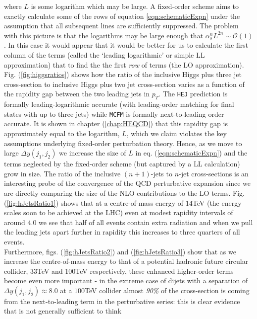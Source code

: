 		where $L$ is some logarithm which may be large.  A fixed-order scheme aims to exactly calculate some of the rows of equation
		\eqref{eqn:schematicExpn} under the assumption that all subsequent lines are sufficiently suppressed.  The problem with this
		picture is that the logarithms may be large enough that $\alpha_s^nL^{2n}\sim\mathcal{O}(1)$.  In this case it would appear
		that it would be better for us to calculate the first column of the terms (called the `leading logarithmic' or simple LL
		approximation) that to find the the first \emph{row} of terms (the LO approximation).\\Fig. (\ref{fig:higgsratios}) shows how
		the ratio of the inclusive Higgs plus three jet cross-section to inclusive Higgs plus two jet cross-section varies as
		a function of the rapidity gap between the two leading jets in $p_T$.  The \texttt{HEJ} prediction is formally leading-logarithmic
		accurate (with leading-order matching for final states with up to three jets) while \texttt{MCFM} is formally next-to-leading order
		accurate.  It is shown in chapter (\ref{chap:HEQCD}) that this rapidity gap is approximately equal to the logarithm, $L$, which
		we claim violates the key assumptions underlying fixed-order perturbation theory.  Hence, as we move to large $\Delta y(j_1, j_2)$
		we increase the size of $L$ in eq. (\ref{eqn:schematicExpn}) and the terms neglected by the fixed-order scheme (but captured by a
		LL calculation) grow in size.  The ratio of the inclusive $(n+1)$-jets to $n$-jet cross-sections is an interesting probe of the
		convergence of the QCD perturbative expansion since we are directly comparing the size of the NLO contributions to the LO terms.
		Fig. (\ref{fig:hJetsRatio1}) shows that at a centre-of-mass energy of $14$TeV (the energy scales soon to be achieved at the LHC)
		even at modest rapidity intervals of around $4.0$ we see that half of all events contain extra radiation and when we pull the leading
		jets apart further in rapidity this increases to three quarters of all events.\\ Furthermore, figs. (\ref{fig:hJetsRatio2}) and
		(\ref{fig:hJetsRatio3}) show that as we increase the centre-of-mass energy to that of a potential hadronic future circular
		collider, $33$TeV and $100$TeV respectively, these enhanced higher-order terms become even more important - in the extreme case
		of dijets with a separation of $\Delta y(j_1, j_2)\approx8.0$ at a $100$TeV collider almost \emph{90\%} of the cross-section is
		coming from the next-to-leading term in the perturbative series: this is clear evidence that is not generally sufficient to think
